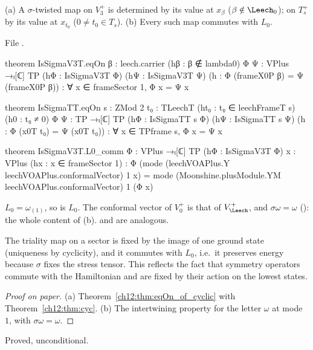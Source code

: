 \begin{theorem}\label{ch12:thm:sectoruniq}
(a) A $\sigma$-twisted map on $V_3^+$ is determined by its value at $x_\beta$ ($\beta\notin\Leech_0$); on
$T_s^+$ by its value at $x_{t_0}$ ($0\neq t_0\in T_s$).  (b) Every such map commutes with $L_0$.
\end{theorem}
File .
\begin{leancode}
theorem IsSigmaV3T.eqOn {β : leech.carrier} (hβ : β ∉ lambda0) {Φ Ψ : VPlus →ₗ[ℂ] TP}
    (hΦ : IsSigmaV3T Φ) (hΨ : IsSigmaV3T Ψ) (h : Φ (frameX0P β) = Ψ (frameX0P β)) :
    ∀ x ∈ frameSector 1, Φ x = Ψ x

theorem IsSigmaTT.eqOn {s : ZMod 2} {t₀ : TLeechT} (ht₀ : t₀ ∈ leechFrameT s) (h0 : t₀ ≠ 0)
    {Φ Ψ : TP →ₗ[ℂ] TP} (hΦ : IsSigmaTT s Φ) (hΨ : IsSigmaTT s Ψ) (h : Φ (x0T t₀) = Ψ (x0T t₀)) :
    ∀ x ∈ TPframe s, Φ x = Ψ x

theorem IsSigmaV3T.L0_comm {Φ : VPlus →ₗ[ℂ] TP} (hΦ : IsSigmaV3T Φ) {x : VPlus}
    (hx : x ∈ frameSector 1) :
    Φ (mode (leechVOAPlus.Y leechVOAPlus.conformalVector) 1 x)
      = mode (Moonshine.plusModule.YM leechVOAPlus.conformalVector) 1 (Φ x)
\end{leancode}
\begin{dictionary}
$L_0=\omega_{(1)}$, so  is $L_0$.  The conformal vector of $V_0^+$ is that of $V_\Leech^+$,
and $\sigma\omega=\omega$ (): the whole content of (b).   and
 are analogous.
\end{dictionary}

\begin{physics}
The triality map on a sector is fixed by the image of one ground state (uniqueness by cyclicity), and it commutes with $L_0$, i.e.\ it preserves energy because $\sigma$ fixes the stress tensor. This reflects the fact that symmetry operators commute with the Hamiltonian and are fixed by their action on the lowest states.
\end{physics}
\begin{proof}[Proof on paper]
(a) Theorem~\ref{ch12:thm:eqOn_of_cyclic} with Theorem~\ref{ch12:thm:cyc}.  (b) The intertwining property
for the letter $\omega$ at mode $1$, with $\sigma\omega=\omega$.
\end{proof}
\begin{status}Proved, unconditional.\end{status}

